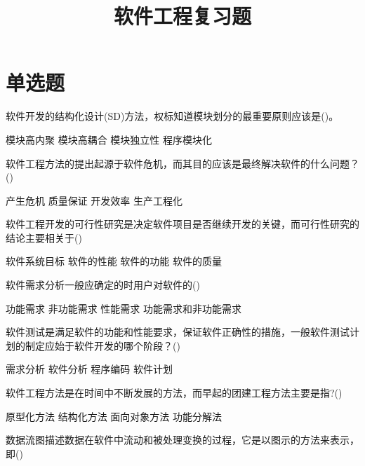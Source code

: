 \documentclass[answers]{exam}
\title{软件工程复习题}
\author{}
\date{}
\begin{document}
\maketitle
\section{单选题}
\begin{questions}
	\question 软件开发的结构化设计(SD)方法，权标知道模块划分的最重要原则应该是()。\\
	\begin{oneparchoices}
		\choice 模块高内聚
		\choice 模块高耦合
		\correctchoice 模块独立性
		\choice 程序模块化
	\end{oneparchoices}
	\question 软件工程方法的提出起源于软件危机，而其目的应该是最终解决软件的什么问题？()\\
	\begin{oneparchoices}
		\choice 产生危机
		\choice 质量保证
		\choice 开发效率
		\correctchoice 生产工程化
	\end{oneparchoices}
	\question 软件工程开发的可行性研究是决定软件项目是否继续开发的关键，而可行性研究的结论主要相关于()\\
	\begin{oneparchoices}
		\correctchoice 软件系统目标
		\choice 软件的性能
		\choice 软件的功能
		\choice 软件的质量
	\end{oneparchoices}
	\question 软件需求分析一般应确定的时用户对软件的()\\
	\begin{oneparchoices}
		\choice 功能需求
		\choice 非功能需求
		\choice 性能需求
		\correctchoice 功能需求和非功能需求
	\end{oneparchoices}
	\question 软件测试是满足软件的功能和性能要求，保证软件正确性的措施，一般软件测试计划的制定应始于软件开发的哪个阶段？()\\
	\begin{oneparchoices}
		\correctchoice 需求分析
		\choice 软件分析
		\choice 程序编码
		\choice 软件计划
	\end{oneparchoices}
	\question 软件工程方法是在时间中不断发展的方法，而早起的团建工程方法主要是指?()\\
	\begin{oneparchoices}
		\choice 原型化方法
		\correctchoice 结构化方法
		\choice 面向对象方法
		\choice 功能分解法
	\end{oneparchoices}
	\question 数据流图描述数据在软件中流动和被处理变换的过程，它是以图示的方法来表示，即()\\
	\begin{oneparchoices}

\end{oneparchoices}
\end{questions}
\end{document}
